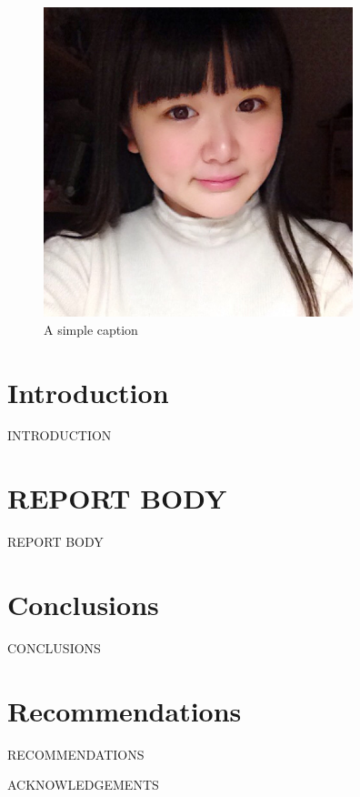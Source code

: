 \documentclass[12pt]{article}
\begin{document}
\begin{figure}[ht!]
\centering
\includegraphics[width=90mm]{img/aaa.jpg}
\caption{A simple caption}
\label{overflow}
\end{figure}


\newpage

\toc


\section{Introduction}
INTRODUCTION


\section{REPORT BODY}
REPORT BODY


\section{Conclusions}
CONCLUSIONS


\section{Recommendations}
RECOMMENDATIONS


\newpage



\newpage


ACKNOWLEDGEMENTS
\newpage


\end{document}
